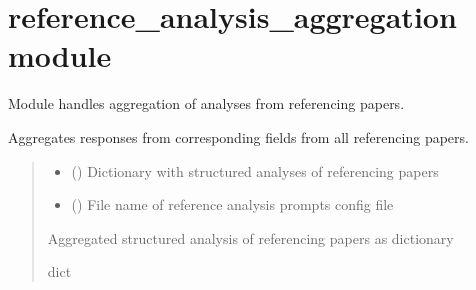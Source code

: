 \documentclass[letterpaper,10pt,english]{sphinxmanual}
\begin{document}
\sphinxstepscope


\section{reference\_analysis\_aggregation module}
\label{\detokenize{reference_analysis_aggregation:module-reference_analysis_aggregation}}\label{\detokenize{reference_analysis_aggregation:reference-analysis-aggregation-module}}\label{\detokenize{reference_analysis_aggregation::doc}}
\sphinxAtStartPar
Module handles aggregation of analyses from referencing papers.

\begin{fulllineitems}
\label{\detokenize{reference_analysis_aggregation:reference_analysis_aggregation.aggregate_reference_analysis}}
\pysigstartsignatures
\pysiglinewithargsret
{}
{\sphinxparamcomma {}}
{}
\pysigstopsignatures
\sphinxAtStartPar
Aggregates responses from corresponding fields from all referencing papers.
\begin{quote}\begin{description}
\begin{itemize}
\item {} 
\sphinxAtStartPar
{} () \textendash{} Dictionary with structured analyses of referencing papers

\item {} 
\sphinxAtStartPar
{} () \textendash{} File name of reference analysis prompts config file

\end{itemize}

\sphinxAtStartPar
Aggregated structured analysis of referencing papers as dictionary

\sphinxAtStartPar
dict

\end{description}\end{quote}

\end{fulllineitems}
\end{document}

